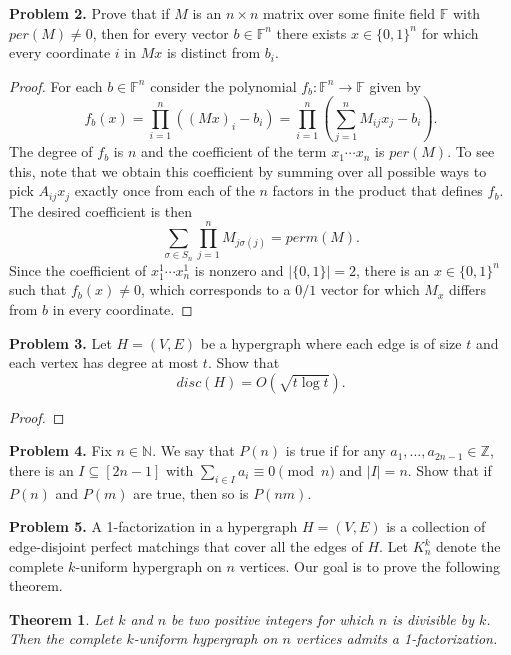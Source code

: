 \documentclass[11pt,letterpaper]{report}
\newcommand{\naturals}{\mathbb{N}}
\newcommand{\integers}{\mathbb{Z}}
\newcommand{\field}{\mathbb{F}}
\theoremstyle{plain}
\newtheorem{theorem}{Theorem}[section]
\begin{document}
\noindent\textbf{Problem 2. }
Prove that if $M$ is an $n\times n$ matrix over some finite field $\field$ with $per(M)\neq 0$, then for every vector $b\in \field^n$ there exists $x\in \{0, 1\}^n$ for which every coordinate $i$ in $Mx$ is distinct from $b_i$.


\begin{proof}
    For each $b\in \field^n$ consider the polynomial $f_b: \field^n\to \field$ given by
    \[
        f_b(x) = \prod_{i=1}^n((Mx)_i - b_i) = \prod_{i=1}^n\left(\sum_{j=1}^nM_{ij}x_j - b_i\right).
    \]
    The degree of $f_b$ is $n$ and the coefficient of the term $x_1\cdots x_n$ is $per(M)$.
    To see this, note that we obtain this coefficient by summing over all possible ways to pick $A_{ij}x_j$ exactly once from each of the $n$ factors in the product that defines $f_b$.
    The desired coefficient is then
    \[
        \sum_{\sigma \in S_n}\prod_{j=1}^nM_{j\sigma(j)} = perm(M).
    \]
    Since the coefficient of $x_1^1\cdots x_n^1$ is nonzero and $|\{0,1\}| = 2$, there is an $x\in \{0,1\}^n$ such that $f_b(x) \neq 0$, which corresponds to a $0/1$ vector for which $M_x$ differs from $b$ in every coordinate.
\end{proof}







\noindent\textbf{Problem 3. }
Let $H = (V, E)$ be a hypergraph where each edge is of size $t$ and each vertex has degree at most $t$.
Show that
\[
    disc(H) = O(\sqrt{t\log t}).
\]

\begin{proof}
    
\end{proof}








\noindent\textbf{Problem 4. }
Fix $n\in \naturals$.
We say that $P(n)$ is true if for any $a_1, \ldots, a_{2n-1}\in \integers$, there is an $I\subseteq [2n-1]$ with $\sum_{i\in I}a_i \equiv 0 \pmod{n}$ and $|I| = n$.
Show that if $P(n)$ and $P(m)$ are true, then so is $P(nm)$.










\noindent\textbf{Problem 5. }
A 1-factorization in a hypergraph $H = (V,E)$ is a collection of edge-disjoint perfect matchings that cover all the edges of $H$.
Let $K_n^k$ denote the complete $k$-uniform hypergraph on $n$ vertices.
Our goal is to prove the following theorem.
\begin{theorem}
    Let $k$ and $n$ be two positive integers for which $n$ is divisible by $k$.
    Then the complete $k$-uniform hypergraph on $n$ vertices admits a 1-factorization.
\end{theorem}
\end{document}
